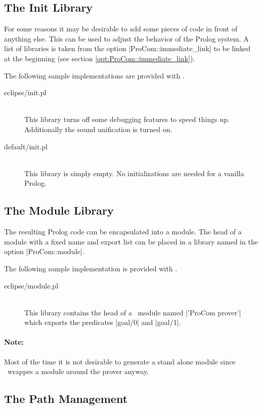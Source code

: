 \subsection{The Init Library}\label{sec:lib.init}

For some reasons it may be desirable to add some pieces of code in front of
anything else. This can be used to adjust the behavior of the Prolog system.
A list of libraries is taken from the option |ProCom::immediate_link| to be
linked at the beginning (see section \ref{opt:ProCom::immediate_link}).

The following sample implementations are provided with \ProCom.
\begin{description}
  \item [eclipse/init.pl]\ \\
  This library turns off some debugging features to speed things up.
  Additionally the sound unification is turned on.
  \item [default/init.pl]\ \\
  This library is simply empty. No initializations are needed for a vanilla
  Prolog.
\end{description}


\subsection{The Module Library}\label{sec:lib.module}

The resulting Prolog code can be encapsulated into a module. The head of a
module with a fixed name and export list can be placed in a library named in
the option |ProCom::module|.

The following sample implementation is provided with \ProCom.
\begin{description}
  \item [eclipse/module.pl]\ \\
  This library contains the head of a \eclipse\ module named |'ProCom prover'|
  which exports the predicates |goal/0| and |goal/1|.
\end{description}

\paragraph{Note:} Most of the time it is not desirable to generate a stand
alone module since \ProTop\ wrappes a module around the prover anyway.

\subsection{The Path Management}\label{sec:lib.path}

